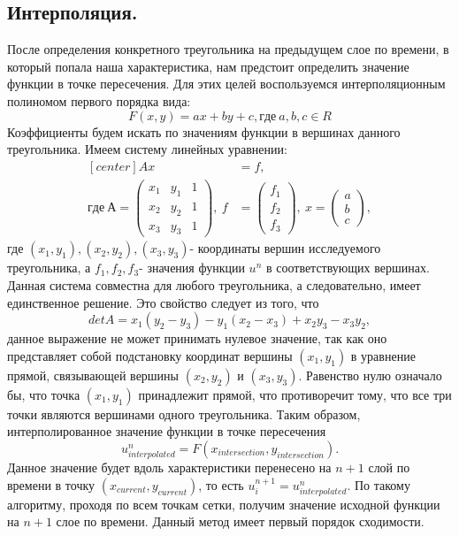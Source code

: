 \documentclass[14pt]{article}
\begin{document}
\subsection{Интерполяция.}
После определения конкретного треугольника на предыдущем слое по времени, в который попала наша характеристика, нам предстоит определить значение функции в точке пересечения. Для этих целей воспользуемся интерполяционным полиномом первого порядка вида:
\begin{equation}
F(x,y) = ax + by +c, где\: a,b,c \in R
\end{equation} 
Коэффициенты будем искать по значениям функции в вершинах данного треугольника. Имеем систему линейных уравнении:
\begin{equation}
\begin{aligned}[center]
 Ax &= f,\\
где\: А = \begin{pmatrix}
x_1 & y_1 & 1\\
x_2 & y_2 & 1\\
x_3 & y_3 & 1
\end{pmatrix} 
, \: f &= \begin{pmatrix}
f_1 \\
f_2 \\
f_3 
\end{pmatrix},
\: x = \begin{pmatrix}
a \\
b \\
c 
\end{pmatrix},  
\end{aligned}
\end{equation}
где $(x_1,y_1 ),(x_2,y_2 ),(x_3,y_3 )$- координаты вершин исследуемого треугольника, а $f_1,f_2,f_3$- значения функции $u^n$ в соответствующих вершинах. Данная система совместна для любого треугольника, а следовательно, имеет единственное решение. Это свойство следует из того, что
\begin{equation}
detA = x_1(y_2-y_3)-y_1(x_2-x_3)+x_2y_3-x_3y_2,
\end{equation}
данное выражение  не может принимать нулевое значение, так как оно представляет собой подстановку координат вершины $(x_1,y_1)$ в уравнение прямой, связывающей вершины $(x_2,y_2)$ и $(x_3,y_3)$. Равенство нулю означало бы, что точка $(x_1,y_1)$ принадлежит прямой, что противоречит тому, что все три точки являются вершинами одного треугольника. Таким образом, интерполированное значение функции в точке пересечения
\begin{equation}
u_{interpolated}^n=F(x_{intersection},y_{intersection}).
\end{equation}
Данное значение будет вдоль характеристики перенесено на $n+1$ слой по времени в точку $(x_{current},y_{current})$, то есть
$u^{n+1}_i= u_{interpolated}^n$.
По такому алгоритму, проходя по всем точкам сетки, получим значение исходной функции на $n+1$ слое по времени. Данный метод имеет первый порядок сходимости. 
\end{document}

